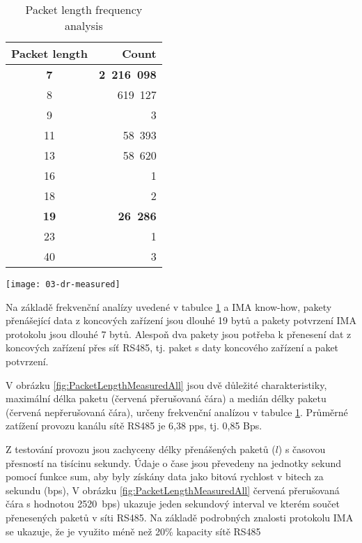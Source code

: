 \begin{table}[h]
\centering
\footnotesize
\caption{Packet length frequency analysis}
\begin{ctucolortab}
    \begin{tabular}{cr}
Packet length &  Count \\ \hline
\textbf{7}  &  \textbf{2~216~098}  \\
8  &   619~127   \\
9  &         3   \\
11 &    58~393   \\
13 &    58~620   \\
16 &         1   \\
18 &         2   \\
\textbf{19} &    \textbf{26~286}   \\
23 &         1   \\
40 &         3   \\
\end{tabular}
\end{ctucolortab}
\label{tab:FreqAnalysis}
\end{table}

\begin{figure*}[ht]
    \centering
    \texttt{[image: 03-dr-measured]}
    \caption{Measured data rate in [bps] in RS485 network during long-term operation test}
    \label{fig:PacketLengthMeasuredAll}
\end{figure*}

Na základě frekvenční analízy uvedené v tabulce \ref{tab:FreqAnalysis} a IMA know-how, pakety přenášející data z koncových zařízení jsou dlouhé 19 bytů a pakety potvrzení IMA protokolu jsou dlouhé 7 bytů. Alespoň dva pakety jsou potřeba k přenesení dat z koncových zařízení přes síť RS485, tj. paket s daty koncového zařízení a paket potvrzení.

V obrázku \ref{fig:PacketLengthMeasuredAll} jsou dvě důležité charakteristiky, maximální délka paketu 
(červená přerušovaná čára) a medián délky paketu (červená nepřerušovaná čára), určeny frekvenční analízou v tabulce \ref{tab:FreqAnalysis}. 
Průměrné zatížení provozu kanálu sítě RS485 je 6,38 pps, tj. 0,85 Bps.


Z testování provozu jsou zachyceny délky přenášených paketů ($ l $) s časovou přesností na tisícinu sekundy. Údaje o čase jsou převedeny na jednotky sekund pomocí funkce sum, aby byly získány data jako bitová rychlost v bitech za sekundu (bps),
V obrázku \ref{fig:PacketLengthMeasuredAll} červená přerušovaná čára s hodnotou 2520~bps) ukazuje jeden sekundový interval ve kterém součet přenesených paketů v síti RS485.
Na základě podrobných znalosti protokolu IMA se ukazuje, že je využito méně než 20\% kapacity sítě RS485 

